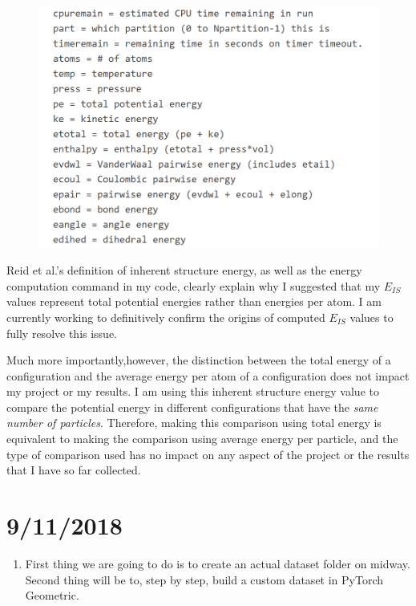 \documentclass[12pt,reqno]{amsart}
\numberwithin{equation}{section}
\begin{document}
\begin{enumerate}
\begin{figure}[H]
\centering
\includegraphics[scale=0.7]{lammps_pe}
\end{figure}



   


Reid et al.'s definition of inherent structure energy, as well as the energy computation command in my code, clearly explain why I suggested that my $E_{IS}$ values represent total potential energies rather than energies per atom.  I am currently working to definitively confirm the origins of computed $E_{IS}$ values to fully resolve this issue.      

\par Much more importantly,however, the distinction between the total energy of a configuration and the average energy per atom of a configuration does not impact my project or my results.  I am using this inherent structure energy value to compare the potential energy in different configurations that have the \textit{same number of particles}.  Therefore, making this comparison using total energy is equivalent to making the comparison using average energy per particle, and the type of comparison used has no impact on any  aspect of the project or the results that I have so far collected.    


\end{enumerate}

\section{9/11/2018}
\begin{enumerate}
\item First thing we are going to do is to create an actual dataset folder on midway.  Second thing will be to, step by step, build a custom dataset in PyTorch Geometric.  
\end{enumerate}




\normalsize

\end{document}
